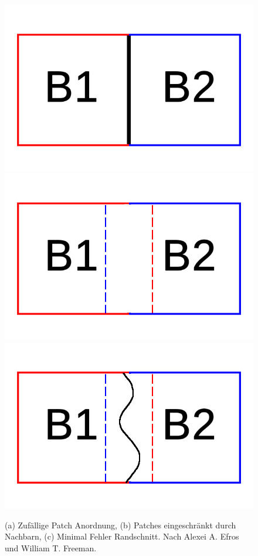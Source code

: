 \documentclass[12pt, a4paper,twoside,openright]{report}
\begin{document}
\begin{figure}[H]
    \centering
    \includegraphics[width=0.25\linewidth]{images/Random-blocks.jpg}%
    \qquad
    \includegraphics[width=0.25\linewidth]{images/overlap-blocks.jpg}%
    \qquad
    \includegraphics[width=0.25\linewidth]{images/minimum-boundary-blocks.jpg}%
    \qquad
    \qquad
    \qquad
    \qquad
    \caption{(a) Zufällige Patch Anordnung, (b) Patches eingeschränkt durch Nachbarn, (c) Minimal Fehler Randschnitt. Nach Alexei A. Efros und William T. Freeman. \cite{EfrosQuilt}}%
\end{figure}
\end{document}
